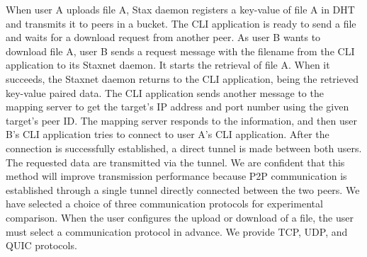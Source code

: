 When user A uploads file A, Stax daemon registers a key-value of file A in DHT and transmits it to peers in a bucket. The CLI application is ready to send a file and waits for a download request from another peer. As user B wants to download file A, user B sends a request message with the filename from the CLI application to its Staxnet daemon. It starts the retrieval of file A. When it succeeds, the Staxnet daemon returns to the CLI application, being the retrieved key-value paired data. The CLI application sends another message to the mapping server to get the target’s IP address and port number using the given target’s peer ID. The mapping server responds to the information, and then user B’s CLI application tries to connect to user A’s CLI application. After the connection is successfully established, a direct tunnel is made between both users. The requested data are transmitted via the tunnel. We are confident that this method will improve transmission performance because P2P communication is established through a single tunnel directly connected between the two peers. We have selected a choice of three communication protocols for experimental comparison. When the user configures the upload or download of a file, the user must select a communication protocol in advance. We provide TCP, UDP, and QUIC protocols.